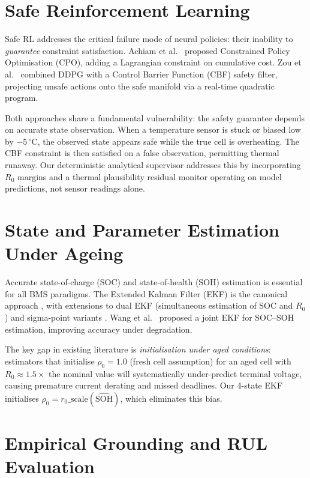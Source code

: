 \section{Safe Reinforcement Learning}

Safe RL addresses the critical failure mode of neural policies: their
inability to \emph{guarantee} constraint satisfaction.  Achiam et
al.~\cite{achiam2017cpo} proposed Constrained Policy Optimisation
(CPO), adding a Lagrangian constraint on cumulative cost.  Zou et
al.~\cite{zou2023cbf} combined DDPG with a Control Barrier Function
(CBF) safety filter, projecting unsafe actions onto the safe manifold
via a real-time quadratic program.

Both approaches share a fundamental vulnerability: the safety
guarantee depends on accurate state observation.  When a temperature
sensor is stuck or biased low by $-5\,^\circ\mathrm{C}$, the observed
state appears safe while the true cell is overheating.  The CBF
constraint is then satisfied on a false observation, permitting
thermal runaway.  Our deterministic analytical supervisor addresses
this by incorporating $R_0$ margins and a thermal plausibility
residual monitor operating on model predictions, not sensor readings
alone.

\section{State and Parameter Estimation Under Ageing}

Accurate state-of-charge (SOC) and state-of-health (SOH) estimation
is essential for all BMS paradigms.  The Extended Kalman Filter (EKF)
is the canonical approach \cite{plett2004ekf}, with extensions to dual
EKF (simultaneous estimation of SOC and $R_0$) and sigma-point
variants \cite{hu2012ekf}.  Wang et al.~\cite{wang2017dual_ekf}
proposed a joint EKF for SOC--SOH estimation, improving accuracy under
degradation.

The key gap in existing literature is \emph{initialisation under
aged conditions}: estimators that initialise $\rho_0 = 1.0$ (fresh
cell assumption) for an aged cell with $R_0 \approx 1.5\times$ the
nominal value will systematically under-predict terminal voltage,
causing premature current derating and missed deadlines.  Our 4-state
EKF initialises $\rho_0 = r_0\text{\_scale}(\widehat{\mathrm{SOH}})$,
which eliminates this bias.

\section{Empirical Grounding and RUL Evaluation}

